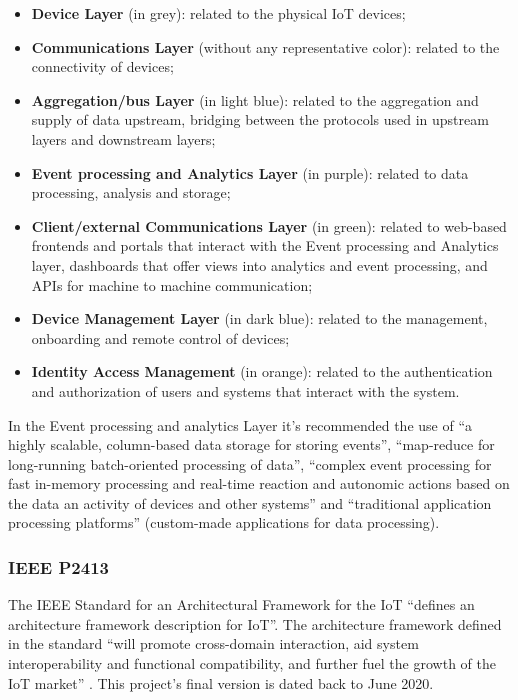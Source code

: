 \begin{itemize}
    \item \textbf{Device Layer} (in grey): related to the physical \gls{IoT} devices;
    \item \textbf{Communications Layer} (without any representative color): related to the connectivity of devices;
    \item \textbf{Aggregation/bus Layer} (in light blue): related to the aggregation and supply of data upstream, bridging between the protocols used in upstream layers and downstream layers; 
    \item \textbf{Event processing and Analytics Layer} (in purple): related to data processing, analysis and storage;
    \item \textbf{Client/external Communications Layer} (in green): related to web-based frontends and portals that interact with the Event processing and Analytics layer, dashboards that
    offer views into analytics and event processing, and \gls{API}s for machine to machine communication;
    \item \textbf{Device Management Layer} (in dark blue): related to the management, onboarding and remote control of devices;
    \item \textbf{Identity Access Management} (in orange): related to the authentication and authorization of users and systems that interact with the system.
\end{itemize}

In the Event processing and analytics Layer it's recommended the use of ``a highly scalable, column-based data storage for storing events'', ``map-reduce for long-running batch-oriented processing of data'', ``complex event processing for fast in-memory processing and real-time reaction and autonomic actions based on the data an activity of devices and other systems'' and ``traditional application processing platforms'' (custom-made applications for data processing).

\subsubsection{IEEE P2413}
\label{subsubsec:stateofart:arch:p2413}

The IEEE Standard for an Architectural Framework for the IoT ``defines an architecture framework description for \gls{IoT}''. The architecture framework defined in the standard ``will promote cross-domain interaction, aid system
interoperability and functional compatibility, and further fuel the growth of the IoT market'' \parencite{9032420}.  This project's final version is dated back to June 2020.

